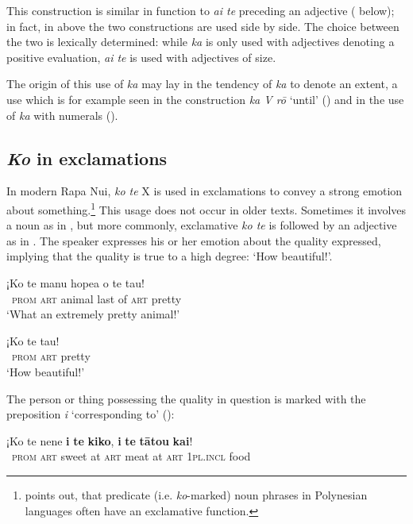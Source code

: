 This construction is similar in function to \textit{{\ꞌ}ai te} preceding an adjective ( below); in fact, in  above the two constructions are used side by side. The choice between the two is lexically determined: while \textit{ka} is only used with adjectives denoting a positive evaluation, \textit{{\ꞌ}ai te} is used with adjectives of size. 

The origin of this use of \textit{ka} may lay in the tendency of \textit{ka} to denote an extent, a use which is for example seen in the construction \textit{ka V rō} ‘until’ () and in the use of \textit{ka} with numerals ().

\subsection{\textit{Ko} in exclamations}\label{sec:10.4.2}

In modern Rapa Nui, \textit{ko te} X is used in exclamations to convey a strong emotion about something.\footnote{\label{fn:491}\citet[149]{Moyse-Faurie2011} points out, that predicate (i.e. \textit{ko}{}-marked) noun phrases in Polynesian languages often have an exclamative function.} This usage does not occur in older texts. Sometimes it involves a noun as in , but more commonly, exclamative \textit{ko te} is followed by an adjective as in . The speaker expresses his or her emotion about the quality expressed, implying that the quality is true to a high degree: ‘How beautiful!’.

\ea\label{ex:10.80}
\gll ¡Ko te manu hope{\ꞌ}a o te tau! \\
~\textsc{prom} \textsc{art} animal last of \textsc{art} pretty \\

\glt 
‘What an extremely pretty animal!’ \textstyleExampleref{[R345.072]} 
\z

\ea\label{ex:10.81}
\gll ¡Ko te tau! \\
~\textsc{prom} \textsc{art} pretty \\

\glt
‘How beautiful!’ \textstyleExampleref{[R412.384]} 
\z

The person or thing possessing the quality in question is marked with the preposition \textit{i} ‘corresponding to’ ():

\ea\label{ex:10.82}
\gll ¡Ko te nene \textbf{i} \textbf{te} \textbf{kiko}, \textbf{i} \textbf{te} \textbf{tātou} \textbf{kai}! \\
~\textsc{prom} \textsc{art} sweet at \textsc{art} meat at \textsc{art} \textsc{1pl.incl} food \\

